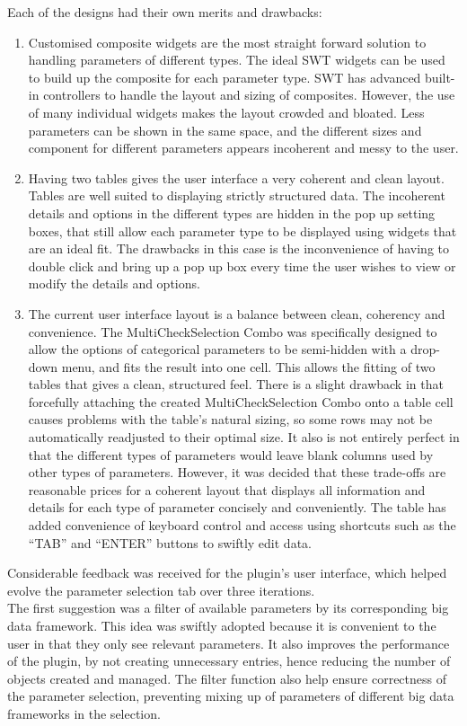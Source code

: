 Each of the designs had their own merits and drawbacks:
\begin{enumerate}
\item Customised composite widgets are the most straight forward solution to handling parameters of different types. The ideal SWT widgets can be used to build up the composite for each parameter type. SWT has advanced built-in controllers to handle the layout and sizing of composites. However, the use of many individual widgets makes the layout crowded and bloated. Less parameters can be shown in the same space, and the different sizes and component for different parameters appears incoherent and messy to the user.
\item Having two tables gives the user interface a very coherent and clean layout. Tables are well suited to displaying strictly structured data. The incoherent details and options in the different types are hidden in the pop up setting boxes, that still allow each parameter type to be displayed using widgets that are an ideal fit. The drawbacks in this case is the inconvenience of having to double click and bring up a pop up box every time the user wishes to view or modify the details and options.
\item The current user interface layout is a balance between clean, coherency and convenience. The MultiCheckSelection Combo \cite{mcsc} was specifically designed to allow the options of categorical parameters to be semi-hidden with a drop-down menu, and fits the result into one cell. This allows the fitting of two tables that gives a clean, structured feel. There is a slight drawback in that forcefully attaching the created MultiCheckSelection Combo onto a table cell causes problems with the table's natural sizing, so some rows may not be automatically readjusted to their optimal size. It also is not entirely perfect in that the different types of parameters would leave blank columns used by other types of parameters. However, it was decided that these trade-offs are reasonable prices for a coherent layout that displays all information and details for each type of parameter concisely and conveniently. The table has added convenience of keyboard control and access using shortcuts such as the ``TAB'' and ``ENTER'' buttons to swiftly edit data.
\end{enumerate}
Considerable feedback was received for the plugin's user interface, which helped evolve the parameter selection tab over three iterations.\\
The first suggestion was a filter of available parameters by its corresponding big data framework. This idea was swiftly adopted because it is convenient to the user in that they only see relevant parameters. It also improves the performance of the plugin, by not creating unnecessary entries, hence reducing the number of objects created and managed. The filter function also help ensure correctness of the parameter selection, preventing mixing up of parameters of different big data frameworks in the selection.\\
